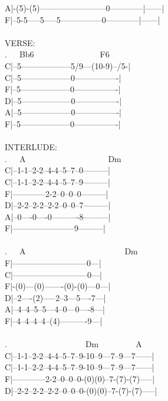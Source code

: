 {A|-(5)-(5)------------------------0------------|------|\\
F|--5-5-----5-----5---------------0------------|------|\\
\\
VERSE:\\
.\ \ \ Bb6\ \ \ \ \ \ \ \ \ \ \ \ \ \ \ \ F6\\
C|--5------------------5/9---(10-9)--/5-|\\
C|--5------------------0----------------|\\
F|--5------------------0----------------|\\
D|--5------------------0----------------|\\
A|--5------------------0----------------|\\
F|--5------------------0----------------|\\
\\
INTERLUDE:\\
.\ \ \ A\ \ \ \ \ \ \ \ \ \ \ \ \ \ \ \ \ \ \ \ Dm\\
C|--1-1--2-2--4-4--5--7--0---------|\\
C|--1-1--2-2--4-4--5--7--9---------|\\
F|------------2-2--0--0--0---------|\\
D|--2-2--2-2--2-2--0--0--7---------|\\
A|--0----0----0----------8---------|\\
F|-----------------------9---------|\\
\\
.\ \ \ A\ \ \ \ \ \ \ \ \ \ \ \ \ \ \ \ \ \ \ \ \ \ \ \ Dm\\
F|---------------------------0---|\\
C|---------------------------0---|\\
F|-(0)---(0)-------(0)-(0)---0---|\\
D|--2----(2)-----2--3---5----7---|\\
A|--4--4--5--5---4--0---0----8---|\\
F|--4--4--4--4--(4)----------9---|\\
\\
.\ \ \ \ \ \ \ \ \ \ \ \ \ \ \ \ \ \ \ Dm\ \ \ \ \ \ \ \ \ A\\
C|--1-1--2-2--4-4--5--7--9-10--9---7--9---7------|\\
C|--1-1--2-2--4-4--5--7--9-10--9---7--9---7------|\\
F|------------2-2--0--0--0-(0)(0)--7-(7)-(7)-----|\\
D|--2-2--2-2--2-2--0--0--0-(0)(0)--7-(7)-(7)-----|\\
}
